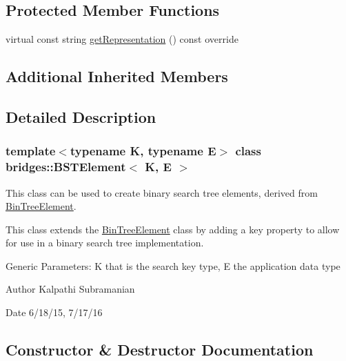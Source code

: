 \subsection*{Protected Member Functions}
\begin{DoxyCompactItemize}
\item 
virtual const string \hyperlink{classbridges_1_1_b_s_t_element_a7c177dc3d3ff942d6d534e1dfcbfee00}{get\+Representation} () const override
\end{DoxyCompactItemize}
\subsection*{Additional Inherited Members}


\subsection{Detailed Description}
\subsubsection*{template$<$typename K, typename E$>$\newline
class bridges\+::\+B\+S\+T\+Element$<$ K, E $>$}

This class can be used to create binary search tree elements, derived from \hyperlink{classbridges_1_1_bin_tree_element}{Bin\+Tree\+Element}. 

This class extends the \hyperlink{classbridges_1_1_bin_tree_element}{Bin\+Tree\+Element} class by adding a key property to allow for use in a binary search tree implementation.

Generic Parameters\+: K that is the search key type, E the application data type

\begin{DoxyAuthor}{Author}
Kalpathi Subramanian 
\end{DoxyAuthor}
\begin{DoxyDate}{Date}
6/18/15, 7/17/16 
\end{DoxyDate}


\subsection{Constructor \& Destructor Documentation}
\hypertarget{classbridges_1_1_b_s_t_element_aff7dbbb4011e85ea492d9a0c921895c5}{}\label{classbridges_1_1_b_s_t_element_aff7dbbb4011e85ea492d9a0c921895c5} 
